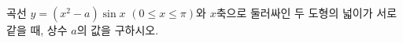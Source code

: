 \hspace*{2mm}\begin{minipage}[t]{\dimexpr\linewidth-2mm\relax}\vspace{0pt}
곡선 $y=(x^2-a)\sin x$ $(0\le x\le\pi)$와 $x$축으로 둘러싸인 두 도형의 넓이가 서로 같을 때, 상수 $a$의 값을 구하시오. \end{minipage}
